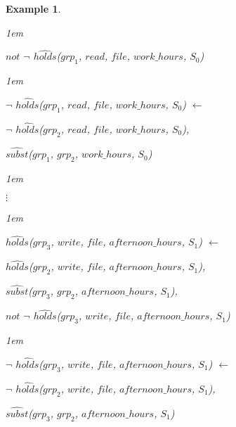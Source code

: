 \documentclass[11pt]{report}
\newtheorem{vexample}{Example}[chapter]
\newenvironment{vquote}
{
  \begin{list}{}{\leftmargin 1em}\item[]
}
{
  \end{list}
}
\begin{document}
\begin{vexample}
\begin{enumerate}
\begin{vquote}
                \hspace{1em}
                $not$ $\lnot$ $\hat{holds}$($grp_1$, $read$, $file$, $work\_hours$, $S_0$)
              \end{vquote}

              \begin{vquote}
                $\lnot$ $\hat{holds}$($grp_1$, $read$, $file$, $work\_hours$, $S_0$) $\leftarrow$

                \hspace{1em}
                $\lnot$ $\hat{holds}$($grp_2$, $read$, $file$, $work\_hours$, $S_0$),

                \hspace{1em}
                $\hat{subst}$($grp_1$, $grp_2$, $work\_hours$, $S_0$)
              \end{vquote}

              \begin{vquote}
                \hspace{1em}
                $\vdots$
              \end{vquote}

              \begin{vquote}
                $\hat{holds}$($grp_3$, $write$, $file$, $afternoon\_hours$, $S_1$) $\leftarrow$

                \hspace{1em}
                $\hat{holds}$($grp_2$, $write$, $file$, $afternoon\_hours$, $S_1$),

                \hspace{1em}
                $\hat{subst}$($grp_3$, $grp_2$, $afternoon\_hours$, $S_1$),

                \hspace{1em}
                $not$ $\lnot$ $\hat{holds}$($grp_3$, $write$, $file$, $afternoon\_hours$, $S_1$)
              \end{vquote}

              \begin{vquote}
                $\lnot$ $\hat{holds}$($grp_3$, $write$, $file$, $afternoon\_hours$, $S_1$) $\leftarrow$

                \hspace{1em}
                $\lnot$ $\hat{holds}$($grp_2$, $write$, $file$, $afternoon\_hours$, $S_1$),

                \hspace{1em}
                $\hat{subst}$($grp_3$, $grp_2$, $afternoon\_hours$, $S_1$)
              \end{vquote}


\end{enumerate}
\end{vexample}
\end{document}

